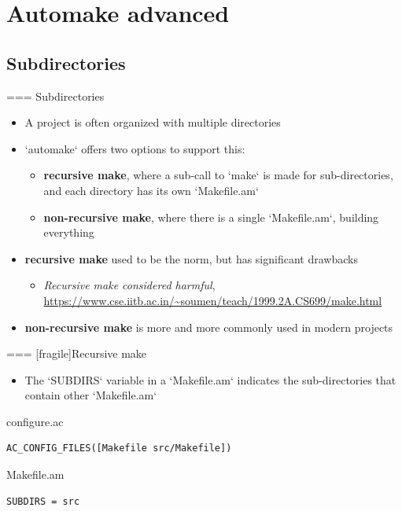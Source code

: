 \section{Automake advanced}

\subsection{Subdirectories}

=== {Subdirectories}
  \begin{itemize}
  \item A project is often organized with multiple directories
  \item `automake` offers two options to support this:
    \begin{itemize}
    \item {\bf recursive make}, where a sub-call to `make` is made
      for sub-directories, and each directory has its own
      `Makefile.am`
    \item {\bf non-recursive make}, where there is a single
      `Makefile.am`, building everything
    \end{itemize}
  \item {\bf recursive make} used to be the norm, but has significant
    drawbacks
    \begin{itemize}
    \item {\em Recursive make considered harmful},
      \url{https://www.cse.iitb.ac.in/~soumen/teach/1999.2A.CS699/make.html}
    \end{itemize}
  \item {\bf non-recursive make} is more and more commonly used in
    modern projects
  \end{itemize}


=== [fragile]{Recursive make}

  \begin{itemize}
  \item The `SUBDIRS` variable in a `Makefile.am` indicates
    the sub-directories that contain other `Makefile.am`
  \end{itemize}

  \begin{block}{configure.ac}
\begin{verbatim}
AC_CONFIG_FILES([Makefile src/Makefile])
\end{verbatim}
  \end{block}

  \begin{block}{Makefile.am}
\begin{verbatim}
SUBDIRS = src
\end{verbatim}
  \end{block}

